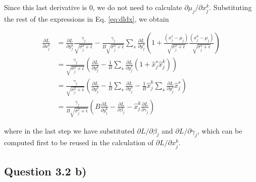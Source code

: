 \documentclass{article}
\newcommand{\pd}[2]{\frac{\partial #1}{\partial #2}}
\begin{document}
Since this last derivative is 0, we do not need to calculate $\partial\mu_j/\partial x_j^k$. Substituting the rest of the expressions in Eq. \ref{eq:dldx}, we obtain

\begin{align*}
\pd{L}{x_j^k} &= \pd{L}{y_j^k}\frac{\gamma_j}{\sqrt{\sigma_j^2 + \epsilon}} -\frac{\gamma_j}{B\sqrt{\sigma_j^2 + \epsilon}}\sum_s \pd{L}{y_j^s}\left(1 + \frac{(x_j^s - \mu_j)}{\sqrt{\sigma_j^2 + \epsilon}}\frac{(x_j^k - \mu_j)}{\sqrt{\sigma_j^2 + \epsilon}}  \right) \\
&=
\frac{\gamma_j}{\sqrt{\sigma_j^2 + \epsilon}}\left(\pd{L}{y_j^k} - \frac{1}{B}\sum_s \pd{L}{y_j^s} (1 + \hat{x}_j^s \hat{x}_j^k) \right) \\
&=
\frac{\gamma_j}{\sqrt{\sigma_j^2 + \epsilon}}\left(\pd{L}{y_j^k} - \frac{1}{B}\sum_s \pd{L}{y_j^s} - \frac{1}{B}\hat{x}_j^k\sum_s \pd{L}{y_j^s}\hat{x}_j^s \right) \\
&=
\frac{\gamma_j}{B\sqrt{\sigma_j^2 + \epsilon}}\left(B\pd{L}{y_j^k} - \pd{L}{\beta_j} - \hat{x}_j^k \pd{L}{\gamma_j} \right)
\end{align*}

where in the last step we have substituted $\partial L/\partial\beta_j$ and $\partial L/\partial\gamma_j$, which can be computed first to be reused in the calculation of $\partial L/\partial x_j^k$.

\subsection*{Question 3.2 b)}




\end{document}
